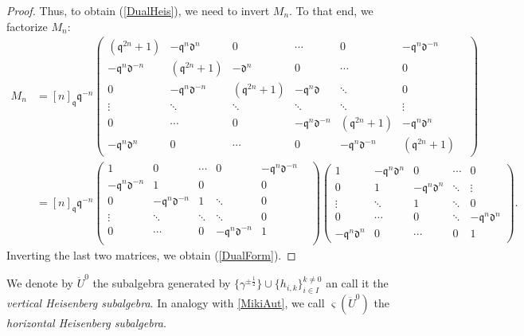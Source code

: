 \documentclass{amsart}
\newcommand{\qqq}{\mathfrak{q}}
\newcommand{\ddd}{\mathfrak{d}}
\theoremstyle{remark}
\numberwithin{thm}{section}
\numberwithin{equation}{section}
\begin{document}
\begin{proof}
    Thus, to obtain (\ref{DualHeis}), we need to invert $M_n$.
    To that end, we factorize $M_n$:
    \begin{align*}
        M_n&=[n]_\qqq\qqq^{-n}
        \begin{pmatrix}
            (\qqq^{2n}+1) & -\qqq^n\ddd^n & 0&\cdots & 0 & -\qqq^n\ddd^{-n}\\
            -\qqq^n\ddd^{-n} & (\qqq^{2n}+1) & -\ddd^n & 0 &\cdots & 0\\
            0 & -\qqq^n\ddd^{-n} & (\qqq^{2n}+1) & -\qqq^n\ddd&\ddots &0\\
            \vdots & \ddots& \ddots& \ddots& \ddots & \vdots&\\
            0 & \cdots & 0 & -\qqq^n\ddd^{-n} & (\qqq^{2n}+1) &-\qqq^n\ddd^n\\
            -\qqq^n\ddd^n & 0 &\cdots & 0& -\qqq^n\ddd^{-n} & (\qqq^{2n}+1)
        \end{pmatrix}\\
        &=[n]_\qqq\qqq^{-n}
        \begin{pmatrix}
            1 &  0&\cdots & 0 & -\qqq^n\ddd^{-n}\\
            -\qqq^n\ddd^{-n} & 1 &  0 & & 0\\
            0 & -\qqq^{n}\ddd^{-n} & 1 & \ddots &0\\
            \vdots & \ddots& \ddots& \ddots& 0&\\
            0 & \cdots & 0 & -\qqq^{n}\ddd^{-n} & 1 \\
        \end{pmatrix}
        \begin{pmatrix}
            1 & -\qqq^n\ddd^n & 0&\cdots & 0 \\
            0 & 1 & -\qqq^n\ddd^n & \ddots & \vdots\\
            \vdots & \ddots & 1 & \ddots &0\\
            0 & \cdots & 0 & \ddots &-\qqq^{n}\ddd^n\\
            -\qqq^{n}\ddd^n & 0 &\cdots & 0& 1
        \end{pmatrix}.
    \end{align*}
    Inverting the last two matrices, we obtain (\ref{DualForm}).
\end{proof}

We denote by $\ddot{U}^0$ the subalgebra generated by $\{\gamma^{\pm\frac{1}{2}}\}\cup\{h_{i, k}\}_{i\in I}^{k\not= 0}$ an call it the \textit{vertical Heisenberg subalgebra}.
In analogy with \ref{MikiAut}, we call $\varsigma(\ddot{U}^0)$ the \textit{horizontal Heisenberg subalgebra}.
\end{document}
